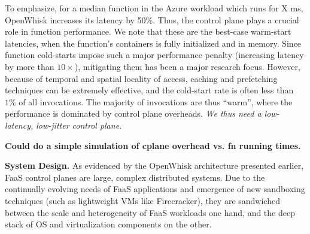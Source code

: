 To emphasize, for a median function in the Azure workload which runs for X ms, OpenWhisk increases its latency by 50\%. 
Thus, the control plane plays a crucial role in function performance.
We note that these are the best-case warm-start latencies, when the function's containers is fully initialized and in memory. 
Since function cold-starts impose such a major performance penalty (increasing latency by more than $10\times$), mitigating them has been a major research focus. 
However, because of temporal and spatial locality of access, caching and prefetching techniques can be extremely effective, and the cold-start rate is often less than $1\% $ of all invocations. 
The majority of invocations are thus ``warm'', where the performance is dominated by control plane overheads.
\emph{We thus need a low-latency, low-jitter control plane.}

\textbf{Could do a simple simulation of cplane overhead vs. fn running times.}

\noindent \textbf{System Design.}
%
As evidenced by the OpenWhisk architecture presented earlier, FaaS control planes are large, complex distributed systems.
Due to the continually evolving needs of FaaS applications and emergence of new sandboxing techniques (such as lightweight VMs like Firecracker), they are sandwiched between the scale and heterogeneity of FaaS workloads one hand, and the deep stack of OS and virtualization components on the other. 

